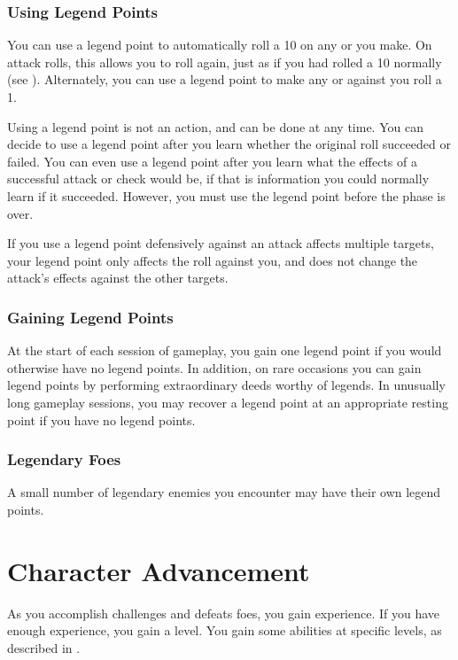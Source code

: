     \subsubsection{Using Legend Points}
        You can use a legend point to automatically roll a 10 on any  or  you make.
        On attack rolls, this allows you to roll again, just as if you had rolled a 10 normally (see ).
        Alternately, you can use a legend point to make any  or  against you roll a 1.

        Using a legend point is not an action, and can be done at any time.
        You can decide to use a legend point after you learn whether the original roll succeeded or failed.
        You can even use a legend point after you learn what the effects of a successful attack or check would be, if that is information you could normally learn if it succeeded.
        However, you must use the legend point before the phase is over.

        If you use a legend point defensively against an attack affects multiple targets, your legend point only affects the roll against you, and does not change the attack's effects against the other targets.

    \subsubsection{Gaining Legend Points}
        At the start of each session of gameplay, you gain one legend point if you would otherwise have no legend points.
        In addition, on rare occasions you can gain legend points by performing extraordinary deeds worthy of legends.
        In unusually long gameplay sessions, you may recover a legend point at an appropriate resting point if you have no legend points.

    \subsubsection{Legendary Foes}
        A small number of legendary enemies you encounter may have their own legend points.

\section{Character Advancement}\label{Character Advancement}

    As you accomplish challenges and defeats foes, you gain experience.
    If you have enough experience, you gain a level.
    You gain some abilities at specific levels, as described in .

